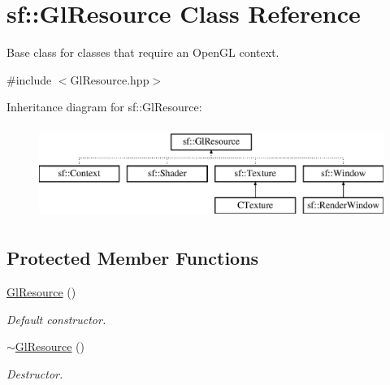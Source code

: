\hypertarget{classsf_1_1GlResource}{\section{sf\-:\-:Gl\-Resource Class Reference}
\label{classsf_1_1GlResource}
}


Base class for classes that require an Open\-G\-L context.  




{\ttfamily \#include $<$Gl\-Resource.\-hpp$>$}

Inheritance diagram for sf\-:\-:Gl\-Resource\-:\begin{figure}[H]
\begin{center}
\leavevmode
\includegraphics[height=3.000000cm]{classsf_1_1GlResource}
\end{center}
\end{figure}
\subsection*{Protected Member Functions}
\begin{DoxyCompactItemize}
\item 
\hypertarget{classsf_1_1GlResource_ad8fb7a0674f0f77e530dacc2a3b0dc6a}{\hyperlink{classsf_1_1GlResource_ad8fb7a0674f0f77e530dacc2a3b0dc6a}{Gl\-Resource} ()}\label{classsf_1_1GlResource_ad8fb7a0674f0f77e530dacc2a3b0dc6a}

\begin{DoxyCompactList}\small\item\em Default constructor. \end{DoxyCompactList}\item 
\hypertarget{classsf_1_1GlResource_ab99035b67052331d1e8cf67abd93de98}{\hyperlink{classsf_1_1GlResource_ab99035b67052331d1e8cf67abd93de98}{$\sim$\-Gl\-Resource} ()}\label{classsf_1_1GlResource_ab99035b67052331d1e8cf67abd93de98}

\begin{DoxyCompactList}\small\item\em Destructor. \end{DoxyCompactList}\end{DoxyCompactItemize}

